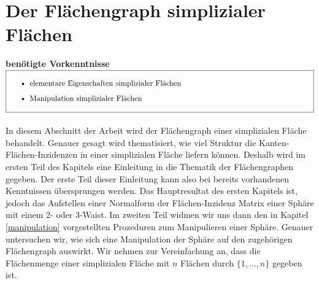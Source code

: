 \documentclass[12pt,titlepage,twoside,cleardoublepage]{article}
\theoremstyle{nummermitklammern}
\numberwithin{equation}{section}
\begin{document}
\section{Der Flächengraph simplizialer Flächen}
\textbf{benötigte Vorkenntnisse}\\
$\fbox{
\parbox{14cm}{\begin{itemize} 
\item elementare Eigenschaften simplizialer Fl\"achen
\item Manipulation simplizialer Fl\"achen
\end{itemize}
}}$\\\\
In diesem Abschnitt der Arbeit wird der Flächengraph einer simplizialen Fläche behandelt. Genauer gesagt wird thematisiert, wie viel Struktur die Kanten-Flächen-Inzidenzen in einer simplizialen Fläche liefern können. Deshalb wird im ersten Teil des Kapitels eine Einleitung in die Thematik der Flächengraphen gegeben. Der erste Teil dieser Einleitung kann also bei bereits vorhandenen Kenntnissen übersprungen werden. Das Hauptresultat des ersten Kapitels ist, jedoch das Aufstellen einer Normalform der Flächen-Inzidenz Matrix einer Sphäre mit einem 2- oder 3-Waist. Im zweiten Teil widmen wir uns dann den in Kapitel \ref{manipulation} vorgestellten Prozeduren zum Manipulieren einer Sphäre. Genauer untersuchen wir, wie sich eine Manipulation der Sphäre auf den zugehörigen Flächengraph auswirkt.  
Wir nehmen zur Vereinfachung an, dass die Flächenmenge einer simplizialen Fläche mit $n$ Flächen  durch $\{1,\ldots,n\}$ gegeben ist.
\end{document}
